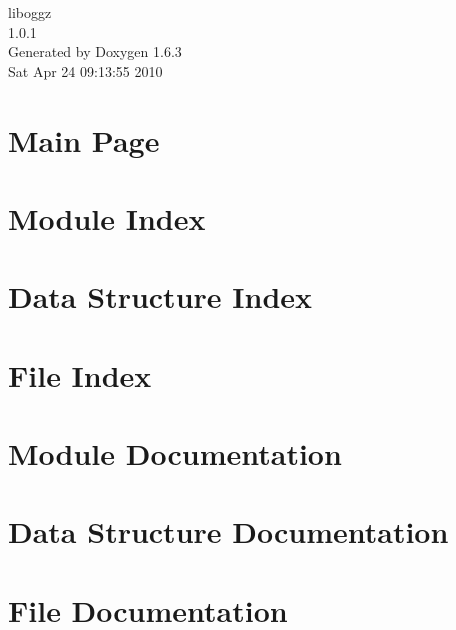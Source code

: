 \documentclass[a4paper]{book}
\begin{document}
\begin{titlepage}
\vspace*{7cm}
\begin{center}
{\Large liboggz \\[1ex]\large 1.0.1 }\\
\vspace*{1cm}
{\large Generated by Doxygen 1.6.3}\\
\vspace*{0.5cm}
{\small Sat Apr 24 09:13:55 2010}\\
\end{center}
\end{titlepage}
\clearemptydoublepage
{}
\tableofcontents
\clearemptydoublepage
{}
\chapter{Main Page}
\label{index}
\chapter{Module Index}

\chapter{Data Structure Index}

\chapter{File Index}

\chapter{Module Documentation}











\chapter{Data Structure Documentation}

\chapter{File Documentation}











\printindex
\end{document}

